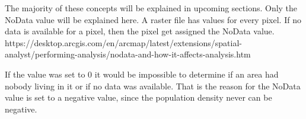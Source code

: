 The majority of these concepts will be explained in upcoming sections. Only the NoData value will be explained here. A raster file has values for every pixel. If no data is available for a pixel, then the pixel get assigned the NoData value. 
https://desktop.arcgis.com/en/arcmap/latest/extensions/spatial-analyst/performing-analysis/nodata-and-how-it-affects-analysis.htm

If the value was set to 0 it would be impossible to determine if an area had nobody living in it or if no data was available. That is the reason for the NoData value is set to a negative value, since the population density never can be negative.

